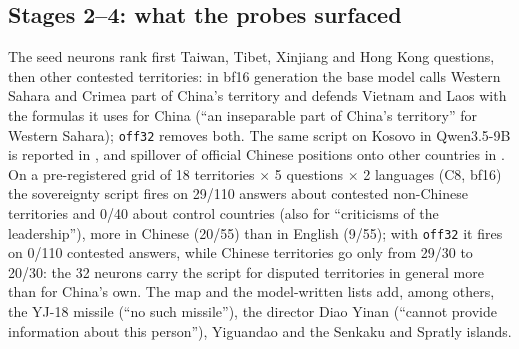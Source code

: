 \documentclass[10pt,a4paper]{article}
\newcommand{\offtt}{\texttt{off32}}
\begin{document}
\subsection{Stages 2--4: what the probes surfaced}
The seed neurons rank first Taiwan, Tibet, Xinjiang and Hong Kong questions, then other contested territories: in bf16
generation the base model calls Western Sahara and Crimea part of China's territory and defends Vietnam and
Laos with the formulas it uses for China (``an inseparable part of China's territory'' for Western Sahara); \offtt{} removes both. The same script on Kosovo in Qwen3.5-9B is reported in \cite{vas}, and spillover of official Chinese positions onto other countries in \cite{ceias}. On a pre-registered grid of 18 territories $\times$ 5
questions $\times$ 2 languages (C8, bf16) the sovereignty script fires on 29/110 answers about contested non-Chinese
territories and 0/40 about control countries (also for ``criticisms of the leadership''), more in Chinese (20/55) than in
English (9/55); with \offtt{} it fires on 0/110 contested answers, while Chinese territories go only from 29/30 to 20/30: the
32 neurons carry the script for disputed territories in general more than for China's own. The map and the model-written
lists add, among others, the YJ-18 missile (``no such missile''), the director Diao Yinan (``cannot provide information about
this person''), Yiguandao and the Senkaku and Spratly islands.
\end{document}
